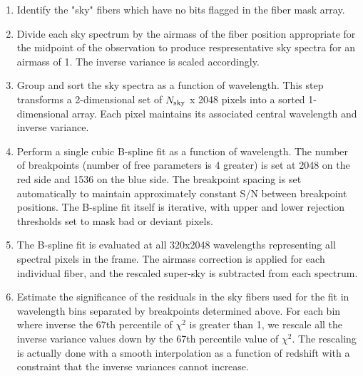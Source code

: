 \documentclass[12pt,preprint]{aastex}
\begin{document}
\begin{enumerate}

\item{Identify the "sky" fibers which have no bits flagged 
in the fiber mask array.}

\item{Divide each sky spectrum by the airmass of the fiber position appropriate
for the midpoint of the observation to produce respresentative sky spectra for 
an airmass of 1.  The inverse variance is scaled accordingly.}

\item{Group and sort the sky spectra as a function of wavelength.  This step
transforms a 2-dimensional set of $N_{\rm sky}$ x 2048 pixels into a sorted 1-dimensional array.  
Each pixel maintains its associated central wavelength and inverse variance. }

\item{Perform a single cubic B-spline fit as a function of wavelength.  
The number of breakpoints (number of free parameters is 4 greater) is set 
at 2048 on the red side and 1536 on the blue side.  The breakpoint spacing 
is set automatically to maintain approximately constant S/N between breakpoint 
positions. The B-spline fit itself is iterative, with upper and lower rejection 
thresholds set to mask bad or deviant pixels. }

\item{The B-spline fit is evaluated at all 320x2048 wavelengths representing all
spectral pixels in the frame.  The airmass correction is applied for each individual 
fiber, and the rescaled super-sky is subtracted from each spectrum.}

\item{Estimate the significance of the residuals in the sky fibers used for the
fit in wavelength bins separated by breakpoints determined above.  For each bin
where inverse the 67th percentile of $\chi^2$ is greater than 1, we rescale 
all the inverse variance values down by the 67th percentile value of $\chi^2$.
The rescaling is actually done with a smooth interpolation as a function of 
redshift with a constraint that the inverse variances cannot increase. }

\end{enumerate}

\end{document}
